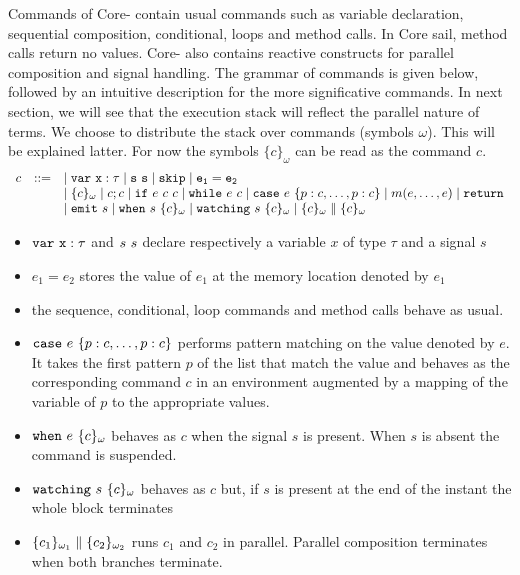 \documentclass[12pt]{article}
\begin{document}
Commands of Core-\sail{} contain usual commands such as variable declaration, sequential composition,
conditional, loops and method calls. In Core sail, method calls return no values.
Core-\sail{} also contains reactive constructs for parallel composition and signal handling.
The grammar of commands is given below, followed by an intuitive description for the more significative commands.
In next section, we will see that the execution stack will reflect the parallel nature of terms. We choose
to distribute the stack over commands (symbols $\omega$). This will be explained latter.
For now the symbols $\{c\}_\omega$ can be read as the command $c$.
$$
  \begin{array}{lcl}
    c & ::= & \mid \tt{var}~x:\tau \mid s~s \mid {\tt{skip}} \mid e_1 = e_2    \\
      &     & \mid \{c\}_\omega \mid c;c \mid {\tt{if}}~e~c~c \mid {\tt{while}}~e~c \mid {\tt{case}}~e~\{p:c,\ldots,p:c\}
    \mid m(e,\ldots,e) \mid {\tt{return}}
    \\
      &     & \mid {\tt{emit}}~s \mid {\tt{when}}~s~\{c\}_\omega \mid {\tt{watching}}~s~\{c\}_\omega
    \mid \{c\}_{\omega} \parallel \{c\}_{\omega}
  \end{array}
$$
\begin{itemize}
  \item $\tt{var}~x:\tau$ and $s~s$ declare respectively a variable $x$
        of type $\tau$ and a signal $s$
  \item $e_1 = e_2$ stores the value of $e_1$ at the memory location denoted by $e_1$
  \item the sequence, conditional, loop commands and method calls behave as usual.
  \item ${\tt{case}}~e~\{p:c,\ldots,p:c\}$ performs pattern matching on the value denoted by
        $e$. It takes the first pattern $p$ of the list that match the value and behaves as the
        corresponding command $c$ in an environment augmented by a mapping of the variable of $p$
        to the appropriate values.
  \item ${\tt{when}}~e~\{c\}_{\omega}$ behaves as $c$ when the signal $s$ is present. When $s$ is absent the
        command is suspended.
  \item ${\tt{watching}}~s~\{c\}_{\omega}$ behaves as $c$ but, if $s$ is present at the end of the instant the
        whole block terminates
  \item $\{c_1\}_{\omega_1} \parallel \{c_2\}_{\omega_2}$ runs $c_1$ and $c_2$ in parallel.
        Parallel composition terminates when both branches terminate.
\end{itemize}
\end{document}

